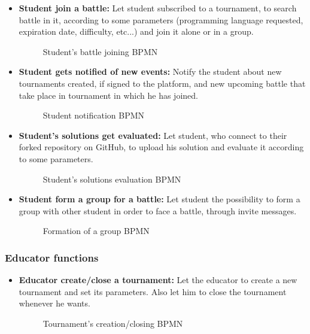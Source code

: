 \documentclass{article}
\begin{document}
{\begin{itemize}
            \item \textbf{Student join a battle:} Let student subscribed to a tournament, to search battle in it, according to some parameters (programming language requested, expiration date, difficulty, etc...) and join it alone or in a group.
            \begin{figure}[H]
                \centering
                \caption{Student's battle joining BPMN}
                \label{fig:studBattleJoinBPMN}
            \end{figure}

            \item \textbf{Student gets notified of new events:} Notify the student about new tournaments created, if signed to the platform, and new upcoming battle that take place in tournament in which he has joined.
            \begin{figure}[H]
                \centering
                \caption{Student notification BPMN}
                \label{fig:studNotificationBPMN}
            \end{figure}
            
            \item \textbf{Student's solutions get evaluated:} Let student, who connect to their forked repository on GitHub, to upload his solution and evaluate it according to some parameters.
            \begin{figure}[H]
                \centering
                \caption{Student's solutions evaluation BPMN}
                \label{fig:studSolEvalBPMN}
            \end{figure}

            \item \textbf{Student form a group for a battle:} Let student the possibility to form a group with other student in order to face a battle, through invite messages.
            \begin{figure}[H]
                \centering
                \caption{Formation of a group BPMN}
                \label{fig:groupFormationBPMN}
            \end{figure}
        \end{itemize}

    \subsubsection{Educator functions}
        \begin{itemize}
            \item \textbf{Educator create/close a tournament:} Let the educator to create a new tournament and set its parameters. Also let him to close the tournament whenever he wants.
            \begin{figure}[H]
                \centering
                \caption{Tournament's creation/closing BPMN}
                \label{fig:TournamentCreationClosingBPMN}
            \end{figure}


\end{itemize}}
\end{document}
